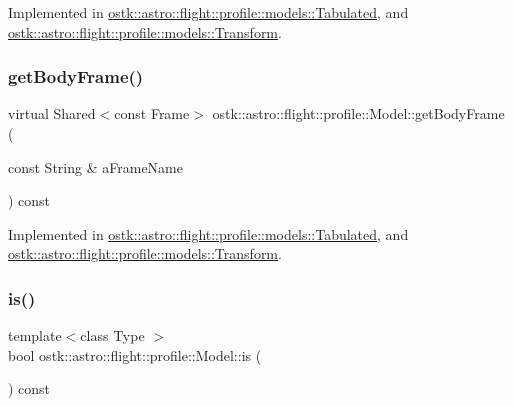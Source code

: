 Implemented in \hyperlink{classostk_1_1astro_1_1flight_1_1profile_1_1models_1_1_tabulated_ac85970f439c8db0684c9349601c226d2}{ostk\+::astro\+::flight\+::profile\+::models\+::\+Tabulated}, and \hyperlink{classostk_1_1astro_1_1flight_1_1profile_1_1models_1_1_transform_a7eb8b58fd5f72e8ee9aa3b94cd0ffaaa}{ostk\+::astro\+::flight\+::profile\+::models\+::\+Transform}.

\mbox{\label{classostk_1_1astro_1_1flight_1_1profile_1_1_model_a04ded49c09d9a44820251c48f47d0ffa}} 
\subsubsection{\texorpdfstring{get\+Body\+Frame()}{getBodyFrame()}}
{\footnotesize\ttfamily virtual Shared$<$const Frame$>$ ostk\+::astro\+::flight\+::profile\+::\+Model\+::get\+Body\+Frame (\begin{DoxyParamCaption}\item[{const String \&}]{a\+Frame\+Name }\end{DoxyParamCaption}) const\hspace{0.3cm}{\ttfamily [pure virtual]}}



Implemented in \hyperlink{classostk_1_1astro_1_1flight_1_1profile_1_1models_1_1_tabulated_a1be1d71748e4e0b59bd3dd2334b759fe}{ostk\+::astro\+::flight\+::profile\+::models\+::\+Tabulated}, and \hyperlink{classostk_1_1astro_1_1flight_1_1profile_1_1models_1_1_transform_a7fa6ee57c59b5bff2c60001c11cac04c}{ostk\+::astro\+::flight\+::profile\+::models\+::\+Transform}.

\mbox{\label{classostk_1_1astro_1_1flight_1_1profile_1_1_model_a73363668308f0293014d6a77063cc809}} 
\subsubsection{\texorpdfstring{is()}{is()}}
{\footnotesize\ttfamily template$<$class Type $>$ \\
bool ostk\+::astro\+::flight\+::profile\+::\+Model\+::is (\begin{DoxyParamCaption}{ }\end{DoxyParamCaption}) const\hspace{0.3cm}{\ttfamily [inline]}}



